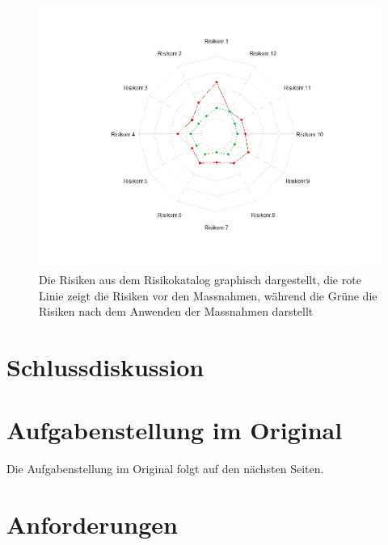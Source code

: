 \documentclass[a4paper]{report}
\begin{document}
\begin{figure}[h!]
	\centering
	\includegraphics[width=\textwidth,keepaspectratio]{Risikomatrix_Spinne}
	\caption{Die Risiken aus dem Risikokatalog graphisch dargestellt, die rote Linie zeigt die Risiken vor den Massnahmen, während die Grüne die Risiken nach dem Anwenden der Massnahmen darstellt}
	\label{fig:Risikomatrix_Spinne}
\end{figure}

\chapter{Schlussdiskussion}
\label{ch:SchlussDisku}

\listoffigures

\listoftables

\printbibliography

\appendix

\chapter{Aufgabenstellung im Original}
\label{app:ch:AufgabenOriginal}
Die Aufgabenstellung im Original folgt auf den nächsten Seiten.



\chapter{Anforderungen}
\label{app:ch:Anforderungen}
\end{document}
